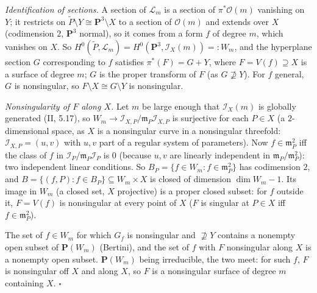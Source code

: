 \documentclass[11pt]{article}
\begin{document}
\emph{Identification of sections.} A section of $\mathcal L_m$ is a section of $\pi^*\mathcal O(m)$ vanishing on $Y$; it restricts on $\tilde P\setminus Y\cong\mathbf P^3\setminus X$ to a section of $\mathcal O(m)$ and extends over $X$ (codimension $2$, $\mathbf P^3$ normal), so it comes from a form $f$ of degree $m$, which vanishes on $X$. So $H^0(\tilde P,\mathcal L_m)=H^0(\mathbf P^3,\mathcal I_X(m))=:W_m$, and the hyperplane section $G$ corresponding to $f$ satisfies $\pi^*(F)=G+Y$, where $F=V(f)\supseteq X$ is a surface of degree $m$; $G$ is the proper transform of $F$ (as $G\not\supseteq Y$). For $f$ general, $G$ is nonsingular, so $F\setminus X\cong G\setminus Y$ is nonsingular.

\emph{Nonsingularity of $F$ along $X$.} Let $m$ be large enough that $\mathcal I_X(m)$ is globally generated (II, 5.17), so $W_m\to\mathcal I_{X,P}/\mathfrak m_P\mathcal I_{X,P}$ is surjective for each $P\in X$ (a $2$-dimensional space, as $X$ is a nonsingular curve in a nonsingular threefold: $\mathcal I_{X,P}=(u,v)$ with $u,v$ part of a regular system of parameters). Now $f\in\mathfrak m_P^2$ iff the class of $f$ in $\mathcal I_P/\mathfrak m_P\mathcal I_P$ is $0$ (because $u,v$ are linearly independent in $\mathfrak m_P/\mathfrak m_P^2$): two independent linear conditions. So $B_P=\{f\in W_m:f\in\mathfrak m_P^2\}$ has codimension $2$, and $B=\{(f,P):f\in B_P\}\subseteq W_m\times X$ is closed of dimension $\dim W_m-1$. Its image in $W_m$ (a closed set, $X$ projective) is a proper closed subset: for $f$ outside it, $F=V(f)$ is nonsingular at every point of $X$ ($F$ is singular at $P\in X$ iff $f\in\mathfrak m_P^2$).

The set of $f\in W_m$ for which $G_f$ is nonsingular and $\not\supseteq Y$ contains a nonempty open subset of $\mathbf P(W_m)$ (Bertini), and the set of $f$ with $F$ nonsingular along $X$ is a nonempty open subset. $\mathbf P(W_m)$ being irreducible, the two meet: for such $f$, $F$ is nonsingular off $X$ and along $X$, so $F$ is a nonsingular surface of degree $m$ containing $X$. \hfill$\square$
\end{document}
